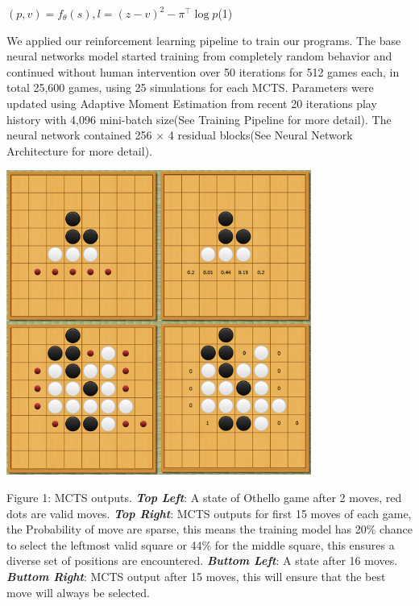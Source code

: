 \documentclass[12pt,a4paper]{report}
\begin{document}
\begin{flushleft}\hspace{4.5cm} \((p, v) = f_θ(s),\)\hspace{1cm}\(l = (z − v)^2 − \pi^\top \log p\)\hfill(1) \end{flushleft} \par
We applied our reinforcement learning pipeline to train our programs. The base neural networks model started training from completely random behavior and continued without human intervention over 50 iterations for 512 games each, in total 25,600 games, using 25 simulations for each MCTS. Parameters were updated using Adaptive Moment Estimation\cite{Adam} from recent 20 iterations play history with 4,096 mini-batch size(See Training Pipeline for more detail). The neural network contained 256 × 4 residual blocks(See Neural Network Architecture for more detail). %
\clearpage
\begin{center}
\includegraphics[width=0.75\textwidth]{Othboard.png}\par
\end{center}
\begin{small}
Figure 1: MCTS outputs. \textit{\textbf{Top Left}}: A state of Othello game after 2 moves, red dots are valid moves. \textit{\textbf{Top Right}}: MCTS outputs for first 15 moves of each game, the Probability of move are sparse, this means the training model has 20\% chance to select the leftmost valid square or 44\% for the middle square, this ensures a diverse set of positions are encountered. \textit{\textbf{Buttom Left}}: A state after 16 moves.  \textit{\textbf{Buttom Right}}: MCTS output after 15 moves, this will ensure that the best move will always be selected.\par
\end{small}
\end{document}
